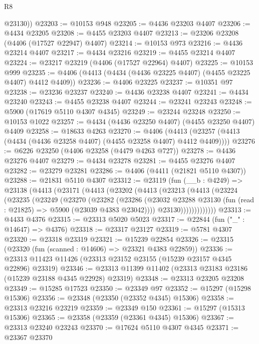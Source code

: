 \begin{lexlean}{R8}
\begin{coremodule}
        @23130))
@23203 := @10153 @948
@23205 := @4436 @23203 @4407
@23206 := @4434 @23205
@23208 := @4455 @23203 @4407
@23213 := @23206 @23208 (@4406 (@17527 @22947) @4407)
@23214 := @10153 @973
@23216 := @4436 @23214 @4407
@23217 := @4434 @23216
@23219 := @4455 @23214 @4407
@23224 := @23217 @23219 (@4406 (@17527 @22964) @4407)
@23225 := @10153 @999
@23235 := @4406 (@4413 (@4434 (@4436 @23225 @4407) (@4455 @23225 @4407) @4412 @4409))
@23236 := @4406 @23225
@23237 := @10351 @97
@23238 := @23236 @23237
@23240 := @4436 @23238 @4407
@23241 := @4434 @23240
@23243 := @4455 @23238 @4407
@23244 := @23241 @23243
@23248 := @5900 (@17619 @5110 @4307 @4345)
@23249 := @23244 @23248
@23250 := @10153 @1022
@23257 := @4434 (@4436 @23250 @4407) (@4455 @23250 @4407) @4409
@23258 := @18633 @4263
@23270 := @4406
    (@4413 (@23257 (@4413 (@4434 (@4436 @23258 @4407) (@4455 @23258 @4407) @4412 @4409))))
@23276 := @6226 @23250 (@4406 @23258 (@4479 @4263 @727))
@23278 := @4436 @23276 @4407
@23279 := @4434 @23278
@23281 := @4455 @23276 @4407
@23282 := @23279 @23281
@23286 := @4406 (@4411 (@21821 @5110 @4307))
@23288 := @21831 @5110 @4307
@23312 := @23119
    (fun (__b : @4249) =>
    @23138
      (@4413
        (@23171
          (@4413
            (@23202
              (@4413
                (@23213
                  (@4413
                    (@23224
                      (@23235
                        (@23249
                          (@23270
                            (@23282
                              (@23286
                                (@23032
                                  @23288
                                  @23130
                                  (fun (read : @21825) => @5900 (@23039 @4383 @23042))))
                              @23130)))))))))))))
@23313 := @4433 @4376
@23315 := @23313 @5020 @5023
@23317 := @22844 (fun ("_" : @14647) => @4376)
@23318 := @23317 @23127
@23319 := @5781 @4307
@23320 := @23318 @23319
@23321 := @15239 @22854
@23326 := @23315 (@23320 (fun (scanned : @14606) => @23321 @4383 @22859))
@23336 := @23313 @11423 @11426 (@23313 @23152 @23155 (@15239 @23157 @4345 @22896) @23319)
@23346 := @23313 @11399 @11402 (@23313 @23183 @23186 (@15239 @23188 @4345 @22928) @23319)
@23348 := @23313 @23205 @23208
@23349 := @15285 @17523
@23350 := @23349 @97
@23352 := @15297 (@15298 @15306)
@23356 := @23348 (@23350 (@23352 @4345) @15306)
@23358 := @23313 @23216 @23219
@23359 := @23349 @150
@23361 := @15297 (@15313 @15306)
@23365 := @23358 (@23359 (@23361 @4345) @15306)
@23367 := @23313 @23240 @23243
@23370 := @17624 @5110 @4307 @4345
@23371 := @23367 @23370

\end{coremodule}
\end{lexlean}
